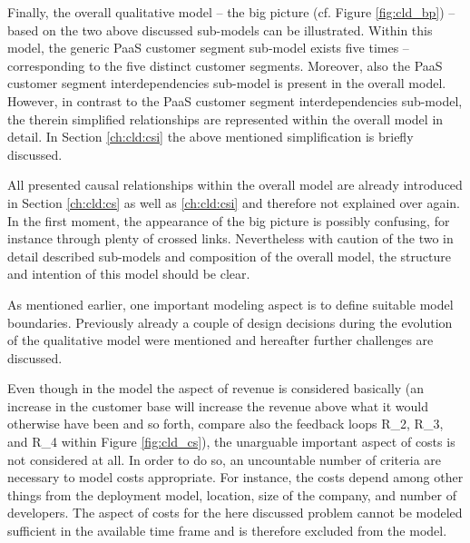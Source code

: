 Finally, the overall qualitative model -- the big picture (cf. Figure \ref{fig:cld_bp}) -- based on the two above discussed sub-models can be illustrated. Within this model, the generic \ac{PaaS} customer segment sub-model exists five times -- corresponding to the five distinct customer segments. Moreover, also the \ac{PaaS} customer segment interdependencies sub-model is present in the overall model. However, in contrast to the \ac{PaaS} customer segment interdependencies sub-model, the therein simplified relationships are represented within the overall model in detail. In Section \ref{ch:cld:csi} the above mentioned simplification is briefly discussed.

All presented causal relationships within the overall model are already introduced in Section \ref{ch:cld:cs} as well as \ref{ch:cld:csi} and therefore not explained over again. In the first moment, the appearance of the big picture is possibly confusing, for instance through plenty of crossed links. Nevertheless with caution of the two in detail described sub-models and composition of the overall model, the structure and intention of this model should be clear.

As mentioned earlier, one important modeling aspect is to define suitable model boundaries. Previously already a couple of design decisions during the evolution of the qualitative model were mentioned and hereafter further challenges are discussed.

Even though in the model the aspect of revenue is considered basically (an increase in the customer base will increase the revenue above what it would otherwise have been and so forth, compare also the feedback loops R\_2, R\_3, and R\_4 within Figure \ref{fig:cld_cs}), the unarguable important aspect of costs is not considered at all. In order to do so, an uncountable number of criteria are necessary to model costs appropriate. For instance, the costs depend among other things from the deployment model, location, size of the company, and number of developers. The aspect of costs for the here discussed problem cannot be modeled sufficient in the available time frame and is therefore excluded from the model.

